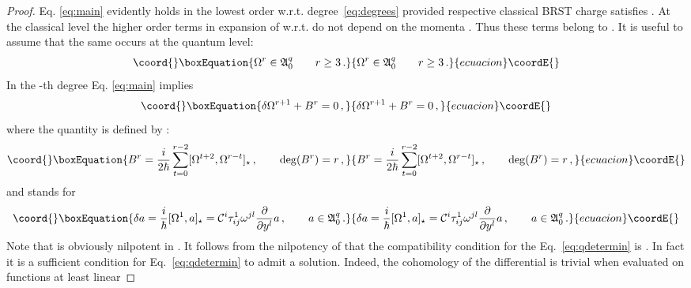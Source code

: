 \documentclass[a4paper,11pt,oneside]{amsart}
\theoremstyle{plain}
\numberwithin{equation}{section} %
\numberwithin{figure}{section} %
\providecommand{\qcommut}[2]{[#1,#2]_\star}
\providecommand{\pb}[2]{\left\{{}#1{},{}#2{}\right\}}
\renewcommand{\deg}[1]{{\rm deg}(#1)}
\def\d{\partial}
\providecommand{\dl}[1]{\displaystyle\frac{{\d}}{\d #1}}
\def\cP{{\mathcal P}}
\def\cc{{\mathcal C}}
\def\aA{{ \mathfrak A}}
\begin{document}
\begin{proof}
Eq. \eqref{eq:main} evidently holds in the lowest order
w.r.t.  degree~\eqref{eq:degrees} provided respective
classical BRST charge \myHighlight{$\Omega$}\coordHE{} satisfies
\myHighlight{$\pb{\Omega}{\Omega}=0$}\coordHE{}.  At the classical level the
higher order terms in expansion of \myHighlight{$\Omega$}\coordHE{} w.r.t. \coordHE{} do
not depend on the momenta \myHighlight{$p_i,\cP_i$}\coordHE{}.  Thus these terms belong
to \myHighlight{$\aA_0$}\coordHE{}.  It is useful to assume that the
same occurs at the quantum level:
\begin{equation}\coord{}\boxEquation{
\Omega^r\in \aA^q_0 \qquad r \geq 3\,.
\label{eq:A0assumption}
}{
\Omega^r\in \aA^q_0 \qquad r \geq 3\,.
}{ecuacion}\coordE{}\end{equation}
In the \coordHE{}-th \coordHE{} degree
Eq. \eqref{eq:main} implies
\begin{equation}\coord{}\boxEquation{
\label{eq:qdetermin}
\delta\Omega^{r+1}+B^r=0\,,
}{
\delta\Omega^{r+1}+B^r=0\,,
}{ecuacion}\coordE{}\end{equation}
where the quantity \coordHE{} is
defined by \coordHE{}:
\begin{equation}\coord{}\boxEquation{
B^r=\frac{i}{2\hbar}\sum_{t=0}^{r-2}
\qcommut{\Omega^{t+2}}{\Omega^{r-t}}\,,
\qquad
\deg{B^r}=r\,,
}{
B^r=\frac{i}{2\hbar}\sum_{t=0}^{r-2}
\qcommut{\Omega^{t+2}}{\Omega^{r-t}}\,,
\qquad
\deg{B^r}=r\,,
}{ecuacion}\coordE{}\end{equation}
and \myHighlight{$\delta\,:\,\aA^q_0\to \aA^q_0$}\coordHE{} stands for
\begin{equation}\coord{}\boxEquation{
  \delta a = \frac{i}{\hbar}\qcommut{\Omega^1}{a}
  = \cc^i\tau^1_{ij}\omega^{jl}\dl{y^l} a\,,
  \qquad a \in \aA^q_0\,.
}{
  \delta a = \frac{i}{\hbar}\qcommut{\Omega^1}{a}
  = \cc^i\tau^1_{ij}\omega^{jl}\dl{y^l} a\,,
  \qquad a \in \aA^q_0\,.
}{ecuacion}\coordE{}\end{equation}
Note that \myHighlight{$\delta$}\coordHE{} is obviously nilpotent in
\myHighlight{$\aA^q_0$}\coordHE{}.  It follows from the nilpotency of \myHighlight{$\delta$}\coordHE{} that the
compatibility condition for the Eq.~\eqref{eq:qdetermin}
is \coordHE{}.  In fact it is a sufficient
condition for Eq.~\eqref{eq:qdetermin} to admit
a solution.  Indeed, the cohomology of the differential
\myHighlight{$\delta$}\coordHE{} is trivial when evaluated on functions at least linear

\end{proof}
\end{document}
